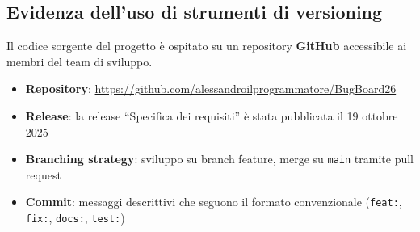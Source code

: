 
\subsection{Evidenza dell'uso di strumenti di versioning}

Il codice sorgente del progetto è ospitato su un repository \textbf{GitHub}
accessibile ai membri del team di sviluppo.

\begin{itemize}
    \item \textbf{Repository}: \url{https://github.com/alessandroilprogrammatore/BugBoard26}
    \item \textbf{Release}: la release ``Specifica dei requisiti'' è stata
    pubblicata il 19 ottobre 2025
    \item \textbf{Branching strategy}: sviluppo su branch feature,
    merge su \texttt{main} tramite pull request
    \item \textbf{Commit}: messaggi descrittivi che seguono il formato
    convenzionale (\texttt{feat:}, \texttt{fix:}, \texttt{docs:}, \texttt{test:})
\end{itemize}
